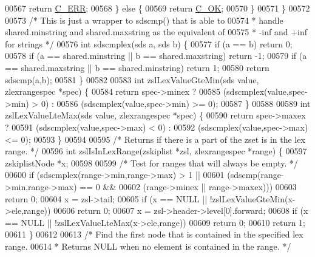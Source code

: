 \begin{DoxyCode}
00567         \textcolor{keywordflow}{return} \hyperlink{server_8h_af98ac28d5f4d23d7ed5985188e6fb7d1}{C\_ERR};
00568     \} \textcolor{keywordflow}{else} \{
00569         \textcolor{keywordflow}{return} \hyperlink{server_8h_a303769ef1065076e68731584e758d3e1}{C\_OK};
00570     \}
00571 \}
00572 
00573 \textcolor{comment}{/* This is just a wrapper to sdscmp() that is able to}
00574 \textcolor{comment}{ * handle shared.minstring and shared.maxstring as the equivalent of}
00575 \textcolor{comment}{ * -inf and +inf for strings */}
00576 \textcolor{keywordtype}{int} sdscmplex(sds a, sds b) \{
00577     \textcolor{keywordflow}{if} (a == b) \textcolor{keywordflow}{return} 0;
00578     \textcolor{keywordflow}{if} (a == shared.minstring || b == shared.maxstring) \textcolor{keywordflow}{return} -1;
00579     \textcolor{keywordflow}{if} (a == shared.maxstring || b == shared.minstring) \textcolor{keywordflow}{return} 1;
00580     \textcolor{keywordflow}{return} sdscmp(a,b);
00581 \}
00582 
00583 \textcolor{keywordtype}{int} zslLexValueGteMin(sds value, zlexrangespec *spec) \{
00584     \textcolor{keywordflow}{return} spec->minex ?
00585         (sdscmplex(value,spec->min) > 0) :
00586         (sdscmplex(value,spec->min) >= 0);
00587 \}
00588 
00589 \textcolor{keywordtype}{int} zslLexValueLteMax(sds value, zlexrangespec *spec) \{
00590     \textcolor{keywordflow}{return} spec->maxex ?
00591         (sdscmplex(value,spec->max) < 0) :
00592         (sdscmplex(value,spec->max) <= 0);
00593 \}
00594 
00595 \textcolor{comment}{/* Returns if there is a part of the zset is in the lex range. */}
00596 \textcolor{keywordtype}{int} zslIsInLexRange(zskiplist *zsl, zlexrangespec *range) \{
00597     zskiplistNode *x;
00598 
00599     \textcolor{comment}{/* Test for ranges that will always be empty. */}
00600     \textcolor{keywordflow}{if} (sdscmplex(range->min,range->max) > 1 ||
00601             (sdscmp(range->min,range->max) == 0 &&
00602             (range->minex || range->maxex)))
00603         \textcolor{keywordflow}{return} 0;
00604     x = zsl->tail;
00605     \textcolor{keywordflow}{if} (x == NULL || !zslLexValueGteMin(x->ele,range))
00606         \textcolor{keywordflow}{return} 0;
00607     x = zsl->header->level[0].forward;
00608     \textcolor{keywordflow}{if} (x == NULL || !zslLexValueLteMax(x->ele,range))
00609         \textcolor{keywordflow}{return} 0;
00610     \textcolor{keywordflow}{return} 1;
00611 \}
00612 
00613 \textcolor{comment}{/* Find the first node that is contained in the specified lex range.}
00614 \textcolor{comment}{ * Returns NULL when no element is contained in the range. */}

\end{DoxyCode}
